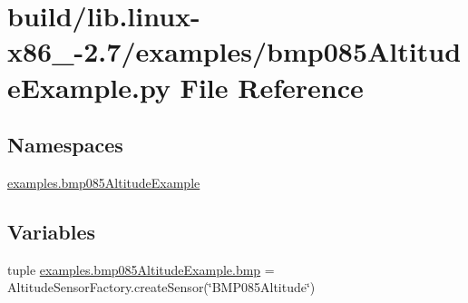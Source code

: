 \hypertarget{build_2lib_8linux-x86__64-2_87_2examples_2bmp085AltitudeExample_8py}{}\section{build/lib.linux-\/x86\+\_-\/2.7/examples/bmp085\+Altitude\+Example.py File Reference}
\label{build_2lib_8linux-x86__64-2_87_2examples_2bmp085AltitudeExample_8py}
\subsection*{Namespaces}
\begin{DoxyCompactItemize}
\item 
 \hyperlink{namespaceexamples_1_1bmp085AltitudeExample}{examples.\+bmp085\+Altitude\+Example}
\end{DoxyCompactItemize}
\subsection*{Variables}
\begin{DoxyCompactItemize}
\item 
tuple \hyperlink{namespaceexamples_1_1bmp085AltitudeExample_a1f89e13f4efa3a3eacb6016c97d18d11}{examples.\+bmp085\+Altitude\+Example.\+bmp} = Altitude\+Sensor\+Factory.\+create\+Sensor(\char`\"{}B\+M\+P085\+Altitude\char`\"{})
\end{DoxyCompactItemize}
